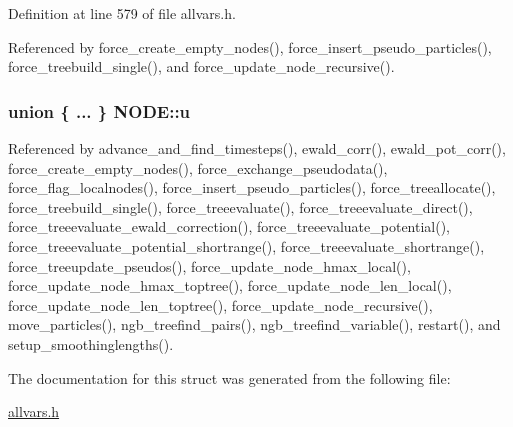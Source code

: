 Definition at line 579 of file allvars.h.



Referenced by force\_\-create\_\-empty\_\-nodes(), force\_\-insert\_\-pseudo\_\-particles(), force\_\-treebuild\_\-single(), and force\_\-update\_\-node\_\-recursive().

\hypertarget{structNODE_acd7e6747d70c2205a6fb3d44b6465dd4}{
\subsubsection[{u}]{\setlength{\rightskip}{0pt plus 5cm}union \{ ... \} 
   {\bf NODE::u}}}
\label{structNODE_acd7e6747d70c2205a6fb3d44b6465dd4}


Referenced by advance\_\-and\_\-find\_\-timesteps(), ewald\_\-corr(), ewald\_\-pot\_\-corr(), force\_\-create\_\-empty\_\-nodes(), force\_\-exchange\_\-pseudodata(), force\_\-flag\_\-localnodes(), force\_\-insert\_\-pseudo\_\-particles(), force\_\-treeallocate(), force\_\-treebuild\_\-single(), force\_\-treeevaluate(), force\_\-treeevaluate\_\-direct(), force\_\-treeevaluate\_\-ewald\_\-correction(), force\_\-treeevaluate\_\-potential(), force\_\-treeevaluate\_\-potential\_\-shortrange(), force\_\-treeevaluate\_\-shortrange(), force\_\-treeupdate\_\-pseudos(), force\_\-update\_\-node\_\-hmax\_\-local(), force\_\-update\_\-node\_\-hmax\_\-toptree(), force\_\-update\_\-node\_\-len\_\-local(), force\_\-update\_\-node\_\-len\_\-toptree(), force\_\-update\_\-node\_\-recursive(), move\_\-particles(), ngb\_\-treefind\_\-pairs(), ngb\_\-treefind\_\-variable(), restart(), and setup\_\-smoothinglengths().



The documentation for this struct was generated from the following file:\begin{DoxyCompactItemize}
\item 
\hyperlink{allvars_8h}{allvars.h}\end{DoxyCompactItemize}
